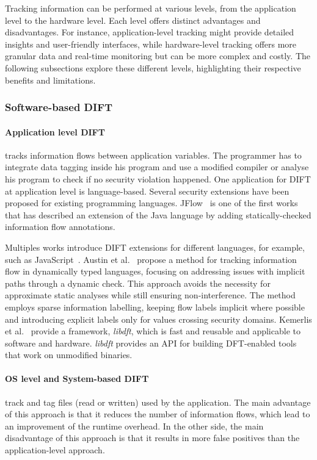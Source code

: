 Tracking information can be performed at various levels, from the application level to the hardware level. Each level offers distinct advantages and disadvantages.
For instance, application-level tracking might provide detailed insights and user-friendly interfaces, while hardware-level tracking offers more granular data and real-time monitoring but can be more complex and costly.
The following subsections explore these different levels, highlighting their respective benefits and limitations.


\subsubsection{Software-based DIFT}
\paragraph{Application level DIFT} tracks information flows between application variables. The programmer has to integrate data tagging inside his program and use a modified compiler or analyse his program to check if no security violation happened.
One application for DIFT at application level is language-based. Several security extensions have been proposed for existing programming languages.
JFlow~\cite{M-99-popl} is one of the first works that has described an extension of the Java language by adding statically-checked information flow annotations.

Multiples works introduce DIFT extensions for different languages, for example, such as JavaScript~\cite{CN-15-ccs, AF-09-plas}.
Austin et al.~\cite{AF-09-plas} propose a method for tracking information flow in dynamically typed languages, focusing on addressing issues with implicit paths through a dynamic check. This approach avoids the necessity for approximate static analyses while still ensuring non-interference. The method employs sparse information labelling, keeping flow labels implicit where possible and introducing explicit labels only for values crossing security domains.
Kemerlis et al.~\cite{KPJK-12-sigplan} provide a framework, \textit{libdft}, which is fast and reusable and applicable to software and hardware. \textit{libdft} provides an API for building DFT-enabled tools that work on unmodified binaries.

\paragraph{OS level and System-based DIFT} track and tag files (read or written) used by the application.
The main advantage of this approach is that it reduces the number of information flows, which lead to an improvement of the runtime overhead. In the other side, the main disadvantage of this approach is that it results in more false positives than the application-level approach.

